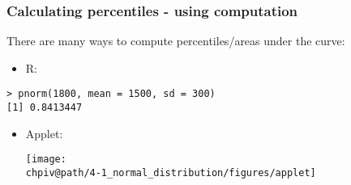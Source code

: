 \documentclass[slidestop,compress,mathserif]{beamer}
\makeatletter
\def\chpiv@path{../../Chp 4}
\makeatother
\begin{document}

\begin{frame}[fragile]
\frametitle{Calculating percentiles - using computation}

There are many ways to compute percentiles/areas under the curve:

\begin{itemize}
\item R:
\end{itemize}
\begin{beamerboxesrounded}[shadow = false, lower = code body]{}
{\small \begin{verbatim}
> pnorm(1800, mean = 1500, sd = 300)
[1] 0.8413447
\end{verbatim}
}
\end{beamerboxesrounded}
\begin{itemize}
\item Applet: {\small {}}
\begin{center}
\texttt{[image: \\chpiv@path/4-1\_normal\_distribution/figures/applet]}
\end{center}

\end{itemize}


\end{frame}

\end{document}
